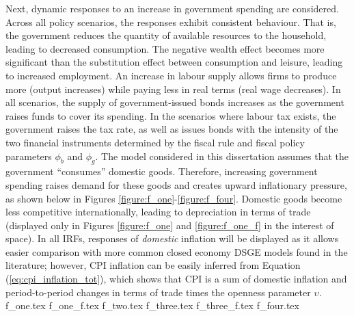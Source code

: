 Next, dynamic responses to an increase in government spending are considered. Across all policy scenarios, the responses exhibit consistent behaviour. That is, the government reduces the quantity of available resources to the household, leading to decreased consumption. The negative wealth effect becomes more significant than the substitution effect between consumption and leisure, leading to increased employment. An increase in labour supply allows firms to produce more (output increases) while paying less in real terms (real wage decreases). In all scenarios, the supply of government-issued bonds increases as the government raises funds to cover its spending. In the scenarios where labour tax exists, the government raises the tax rate, as well as issues bonds with the intensity of the two financial instruments determined by the fiscal rule and fiscal policy parameters $\phi_b$ and $\phi_g$. The model considered in this dissertation assumes that the government ``consumes'' domestic goods. Therefore, increasing government spending raises demand for these goods and creates upward inflationary pressure, as shown below in Figures \ref{figure:f_one}-\ref{figure:f_four}. Domestic goods become less competitive internationally, leading to depreciation in terms of trade (displayed only in Figures \ref{figure:f_one} and \ref{figure:f_one_f} in the interest of space). In all IRFs, responses of \textit{domestic} inflation will be displayed as it allows easier comparison with more common closed economy DSGE models found in the literature; however, CPI inflation can be easily inferred from Equation (\ref{eq:cpi_inflation_tot}), which shows that CPI is a sum of domestic inflation and period-to-period changes in terms of trade times the openness parameter $\upsilon$.
{f_one.tex}
{f_one_f.tex}
{f_two.tex}
{f_three.tex}
{f_three_f.tex}
{f_four.tex}
